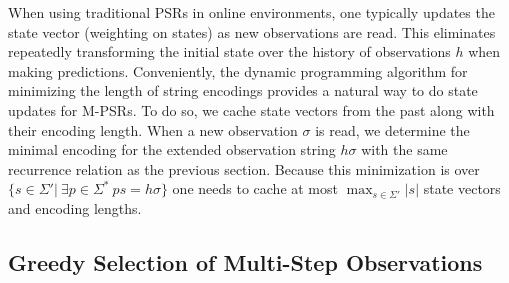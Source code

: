 When using traditional PSRs in online environments, one typically updates the state vector (weighting on states) as new observations are read. This eliminates repeatedly transforming the initial state over the history of observations $h$ when making predictions. Conveniently, the dynamic programming algorithm for minimizing the length of string encodings provides a natural way to do state updates for M-PSRs. To do so, we cache state vectors from the past along with their encoding length. When a new observation $\sigma$ is read, we determine the minimal encoding for the extended observation string $h \sigma$ with the same recurrence relation as the previous section. Because this minimization is over $\{s \in \Sigma'| ~ \exists p \in \Sigma^* ~ ps= h\sigma\}$ one needs to cache at most $\max_{s \in \Sigma'} |s|$ state vectors and encoding lengths. 



\subsection{Greedy Selection of Multi-Step Observations}

%
%
%
%
%

